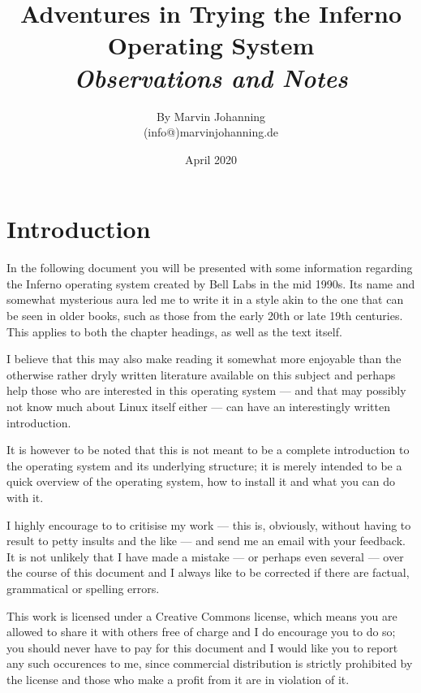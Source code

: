 \documentclass[a4paper,12pt]{report}
\begin{document}

\title{%
  Adventures in Trying the Inferno Operating System \\
  \textit{Observations and Notes}
}
\author{By Marvin Johanning\\(info@)marvinjohanning.de}
\date{April 2020}
\maketitle
\pagebreak

\tableofcontents
\pagebreak


\chapter*{Introduction}
In the following document you will be presented with some information regarding the Inferno operating system created by Bell Labs in the mid 1990s. Its name and somewhat mysterious aura led me to write it in a style akin to the one that can be seen in older books, such as those from the early 20th or late 19th centuries. This applies to both the chapter headings, as well as the text itself.

I believe that this may also make reading it somewhat more enjoyable than the otherwise rather dryly written literature available on this subject and perhaps help those who are interested in this operating system — and that may possibly not know much about Linux itself either — can have an interestingly written introduction.

It is however to be noted that this is not meant to be a complete introduction to the operating system and its underlying structure; it is merely intended to be a quick overview of the operating system, how to install it and what you can do with it.

I highly encourage to to critisise my work — this is, obviously, without having to result to petty insults and the like — and send me an email with your feedback. It is not unlikely that I have made a mistake — or perhaps even several — over the course of this document and I always like to be corrected if there are factual, grammatical or spelling errors.

This work is licensed under a Creative Commons license, which means you are allowed to share it with others free of charge and I do encourage you to do so; you should never have to pay for this document and I would like you to report any such occurences to me, since commercial distribution is strictly prohibited by the license and those who make a profit from it are in violation of it.
\end{document}
